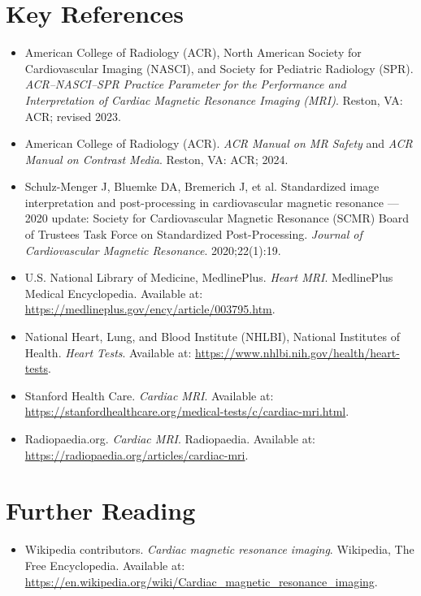\section{Key References}
\begin{itemize}
\item American College of Radiology (ACR), North American Society for Cardiovascular Imaging (NASCI), and Society for Pediatric Radiology (SPR). \textit{ACR--NASCI--SPR Practice Parameter for the Performance and Interpretation of Cardiac Magnetic Resonance Imaging (MRI)}. Reston, VA: ACR; revised 2023.
\item American College of Radiology (ACR). \textit{ACR Manual on MR Safety} and \textit{ACR Manual on Contrast Media}. Reston, VA: ACR; 2024.
\item Schulz-Menger J, Bluemke DA, Bremerich J, et al. Standardized image interpretation and post-processing in cardiovascular magnetic resonance --- 2020 update: Society for Cardiovascular Magnetic Resonance (SCMR) Board of Trustees Task Force on Standardized Post-Processing. \textit{Journal of Cardiovascular Magnetic Resonance}. 2020;22(1):19.
\item U.S. National Library of Medicine, MedlinePlus. \textit{Heart MRI}. MedlinePlus Medical Encyclopedia. Available at: \url{https://medlineplus.gov/ency/article/003795.htm}.
\item National Heart, Lung, and Blood Institute (NHLBI), National Institutes of Health. \textit{Heart Tests}. Available at: \url{https://www.nhlbi.nih.gov/health/heart-tests}.
\item Stanford Health Care. \textit{Cardiac MRI}. Available at: \url{https://stanfordhealthcare.org/medical-tests/c/cardiac-mri.html}.
\item Radiopaedia.org. \textit{Cardiac MRI}. Radiopaedia. Available at: \url{https://radiopaedia.org/articles/cardiac-mri}.
\end{itemize}

\section{Further Reading}
\begin{itemize}
  \item Wikipedia contributors. \textit{Cardiac magnetic resonance imaging}. Wikipedia, The Free Encyclopedia. Available at: \url{https://en.wikipedia.org/wiki/Cardiac_magnetic_resonance_imaging}.
\end{itemize}
